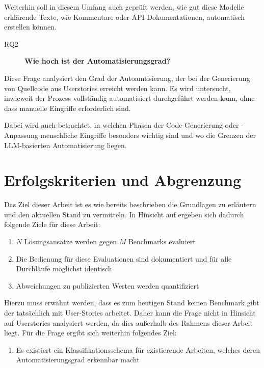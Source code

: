Weiterhin soll in diesem Umfang auch geprüft werden, wie gut diese Modelle erklärende Texte, wie Kommentare oder API-Dokumentationen, automatisch erstellen können.

\begin{description}
    \item[RQ2]\label{RQ2} \textbf{Wie hoch ist der Automatisierungsgrad?}
\end{description}

Diese Frage analysiert den Grad der Autoamtisierung, der bei der Generierung von Quellcode aus Userstories erreicht werden kann. Es wird untersucht, inwieweit der Prozess vollständig automatisiert durchgeführt werden kann, ohne dass manuelle Eingriffe erforderlich sind. 

Dabei wird auch betrachtet, in welchen Phasen der Code-Generierung oder -Anpassung menschliche Eingriffe besonders wichtig sind und wo die Grenzen der LLM-basierten Automatisierung liegen.

\section{Erfolgskriterien und Abgrenzung}\label{ch:Erfolgskriterien und Abgrenzung}

Das Ziel dieser Arbeit ist es wie bereits beschrieben die Grundlagen zu erläutern und den aktuellen Stand zu vermitteln. In Hinsicht auf  ergeben sich dadurch folgende Ziele für diese Arbeit:

\begin{enumerate}
    \item $N$ Lösungsansätze werden gegen $M$ Benchmarks evaluiert
    \item Die Bedienung für diese Evaluationen sind dokumentiert und für alle Durchläufe möglichst identisch
    \item Abweichungen zu publizierten Werten werden quantifiziert
\end{enumerate}

Hierzu muss erwähnt werden, dass es zum heutigen Stand keinen Benchmark gibt der tatsächlich mit User-Stories arbeitet. Daher kann die Frage  nicht in Hinsicht auf Userstories analysiert werden, da dies außerhalb des Rahmens dieser Arbeit liegt. Für die Frage  ergibt sich weiterhin folgendes Ziel:

\begin{enumerate}
    \item Es existiert ein Klassifikationsschema für existierende Arbeiten, welches deren Automatisierungsgrad erkennbar macht
\end{enumerate}

